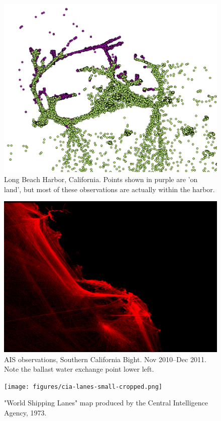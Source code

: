 \begin{figure}
  \centering
  \includegraphics[width=120mm]{figures/example-long-beach-harbor-validation.png}
  \caption[Long Beach harbor, validation]{Long Beach Harbor, California. Points shown in purple are 'on land', but most of these observations are actually within the harbor.} %
  \label{fig:longbeach-validation}
\end{figure}

\begin{figure}[htbp]
  \centering
  \includegraphics[width=140mm]{figures/cargo_density.png}
  \caption[AIS observations, Southern California Bight]{AIS observations, Southern California Bight. Nov 2010--Dec 2011. Note the ballast water exchange point lower left.}
  \label{fig:cal-cargo}
\end{figure}

\begin{figure}[htbp]
  \centering
  \hspace*{-.15in}
  \texttt{[image: figures/cia-lanes-small-cropped.png]}
  \caption[CIA "World Shipping Lanes"]{"World Shipping Lanes" map produced by the Central Intelligence Agency, 1973.}
  \label{fig:cia-shipping-map}
\end{figure}


